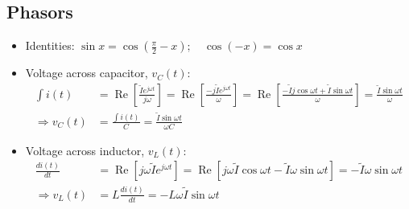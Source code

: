 \documentclass[a4paper]{article}
\begin{document}
\subsection{Phasors}
\begin{itemize}
    \item Identities: $\sin x = \cos\left(\displaystyle\frac{\pi}{2}-x\right);\quad\cos(-x) = \cos x$
    \item Voltage across capacitor, $v_C(t)$:
    \begin{align*}
        \int i(t) &= \operatorname{Re}\left[\frac{\widetilde{I}e^{j\omega t}}{j\omega}\right] =  \operatorname{Re}\left[\frac{-j\widetilde{I}e^{j\omega t}}{\omega}\right]=\operatorname{Re}\left[\frac{-\widetilde{I}j\cos\omega t+\widetilde{I}\sin\omega t}{\omega}\right]= \frac{\widetilde{I}\sin\omega t}{\omega}\\
        \Rightarrow v_C(t) &= \frac{\int i(t)}{C} = \frac{\widetilde{I}\sin\omega t}{\omega C}
    \end{align*}
    \item Voltage across inductor, $v_L(t)$:
    \begin{align*}
        \frac{di(t)}{dt} &= \operatorname{Re}\left[j\omega \widetilde{I}e^{j\omega t}\right] = \operatorname{Re}\left[j\omega\widetilde{I}\cos\omega t-\widetilde{I}\omega\sin\omega t\right] = -\widetilde{I}\omega \sin\omega t\\
        \Rightarrow v_L(t) &= L\frac{di(t)}{dt} = -L\omega\widetilde{I}\sin\omega t
    \end{align*}
\end{itemize}
\end{document}

